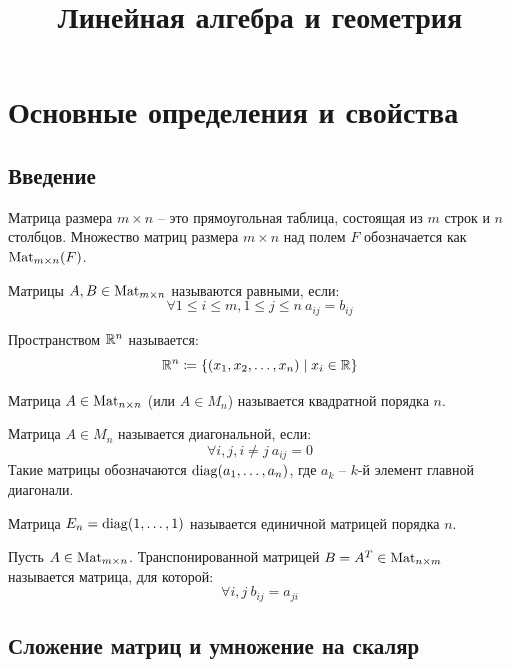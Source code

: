 \documentclass[12pt]{article}
\title{\textbf{Линейная алгебра и геометрия}}\date{}\author{}
\begin{document}
\maketitle
\tableofcontents
\label{toc}
\newpage

\section{Основные определения и свойства}

\subsection{Введение}

\begin{definition}
	Матрица размера $m \times n$ -- это прямоугольная таблица, состоящая
	из $m$ строк и $n$ столбцов. Множество матриц размера $m \times n$
	над полем $F$ обозначается как $\operatorname{Mat}_{m \times n}(F)$.
\end{definition}
\begin{definition}
	Матрицы $A,B\in \operatorname{Mat}_{m \times n}$ называются равными, если:
	\[\forall 1 \leqslant i \leqslant m, 1 \leqslant j \leqslant
	n\ a_{ij} = b_{ij}\]
\end{definition}
\begin{definition}
	Пространством $\mathbb{R}^n$ называется:
	\[\mathbb{R}^n \coloneqq \{(x_1, x_2, \ldots, x_n) \mid x_i \in \mathbb{R}\}\]
\end{definition}
\begin{definition}
	Матрица $A\in \operatorname{Mat}_{n \times n}$ (или $A \in M_n$) называется
	квадратной порядка $n$.
\end{definition}
\begin{definition}
	Матрица $A\in M_n$ называется диагональной, если:
	\[\forall i, j, i \neq j\ a_{ij}=0\]	Такие матрицы обозначаются
	$\operatorname{diag}(a_1, \ldots, a_n)$, где $a_k$ --
	$k$-й элемент главной диагонали.
\end{definition}
\begin{definition}
	Матрица $E_n=\operatorname{diag}(1,\ldots,1)$ называется единичной матрицей порядка $n$.
\end{definition}
\begin{definition}
	Пусть $A\in \operatorname{Mat}_{m \times n}$. Транспонированной матрицей $B=A^T\in
	\operatorname{Mat}_{n \times m}$ называется матрица, для которой:
	\[\forall i, j\ b_{ij}=a_{ji}\]
\end{definition}

\subsection{Сложение матриц и умножение на скаляр}
\end{document}
